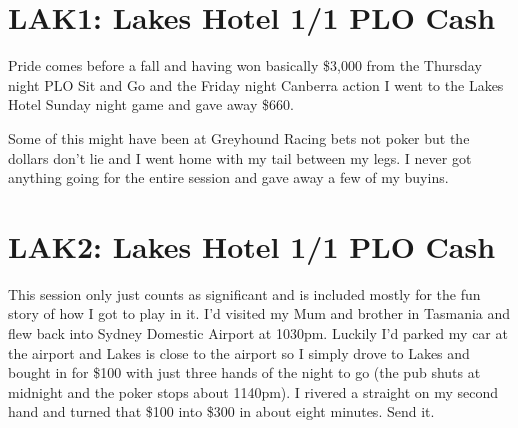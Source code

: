 \section*{LAK1: Lakes Hotel 1/1 PLO Cash}

Pride comes before a fall and having won basically \$3,000 from the
Thursday night PLO Sit and Go and the Friday night Canberra action I
went to the Lakes Hotel Sunday night game and gave away \$660.

Some of this might have been at Greyhound Racing bets not poker but
the dollars don't lie and I went home with my tail between my legs. I
never got anything going for the entire session and gave away a few of
my buyins.

\section*{LAK2: Lakes Hotel 1/1 PLO Cash}

This session only just counts as significant and is included mostly
for the fun story of how I got to play in it. I'd visited my Mum and
brother in Tasmania and flew back into Sydney Domestic Airport at
1030pm. Luckily I'd parked my car at the airport and Lakes is close to
the airport so I simply drove to Lakes and bought in for \$100 with
just three hands of the night to go (the pub shuts at midnight and the
poker stops about 1140pm). I rivered a straight on my second hand and
turned that \$100 into \$300 in about eight minutes. Send it.
